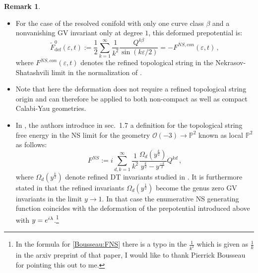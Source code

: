 \documentclass[a4paper,12pt,justification=centering]{article}
\numberwithin{equation}{section}
\newcommand{\ii}{\textnormal{i}}
\theoremstyle{plain}%
\theoremstyle{definition}
\newtheorem{rem}[thm]{Remark}
\begin{document}
\begin{rem}\label{rem:fdef}
\begin{itemize}
\item For the case of the resolved conifold with only one curve class $\beta$ and a nonvanishing GV invariant only at degree $1$, this deformed prepotential is:
\begin{equation}
\tilde{F}^{0}_{\textrm{def}}(\varepsilon,t):=\frac{1}{2}  \sum_{k=1}^{\infty} \frac{1}{k^2} \frac{Q^{k\beta}}{\sin(k\varepsilon/2)}= -F^{NS,con}(\varepsilon,t)\,,
\end{equation}
where $F^{NS,con}(\varepsilon,t)$ denotes the refined topological string in the Nekrasov-Shatashvili limit in the normalization of \cite{Alim:2022oll}. 
\item Note that here the deformation does not require a refined topological string origin and can therefore be applied to both non-compact as well as compact Calabi-Yau geometries.
\item In \cite{Bousseau:Anomaly}, the authors introduce in sec.~1.7  a definition for the topological string free energy in the NS limit for the geometry $\mathcal{O}(-3) \rightarrow \mathbb{P}^2$ known as local $\mathbb{P}^2$ as follows:
\begin{equation} \label{Bousseau:FNS}
F^{NS}:= i \sum_{d,k=1}^{\infty} \frac{1}{k^2} \frac{\Omega_d(y^{\frac{k}{2}})}{y^{\frac{k}{2}}-y^{\frac{-k}{2}}} Q^{kd}\,, 
\end{equation}
where $\Omega_d(y^{\frac{k}{2}})$ denote refined DT invariants studied in \cite{Bousseau:Scattering}. It is furthermore stated in \cite{Bousseau:Anomaly} that the refined invariants $\Omega_d(y^{\frac{1}{2}})$ become the genus zero GV invariants in the limit $y\rightarrow 1$. In that case the enumerative NS generating function coincides with the deformation of the prepotential introduced above with $y=e^{\ii \lambda}$.\footnote{In the formula for  \eqref{Bousseau:FNS} there is a typo in the $\frac{1}{k^2}$ which is given as $\frac{1}{k}$ in the arxiv preprint of that paper, I would like to thank Pierrick Bousseau for pointing this out to me.}
\end{itemize}
\end{rem}
\end{document}
